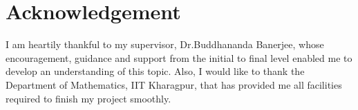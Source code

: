 \documentclass[12pt, reqno]{amsart}
\begin{document}
\vspace{1cm}
\section{Acknowledgement}
 I am heartily thankful to my supervisor,
 Dr.Buddhananda Banerjee, whose encouragement, guidance and support from the initial to final level enabled me to develop an understanding of this topic. Also, I would like to thank the  Department of Mathematics, IIT Kharagpur, that has  provided me all facilities required to finish my project smoothly.
\newpage



\vspace{1cm}
\end{document}
